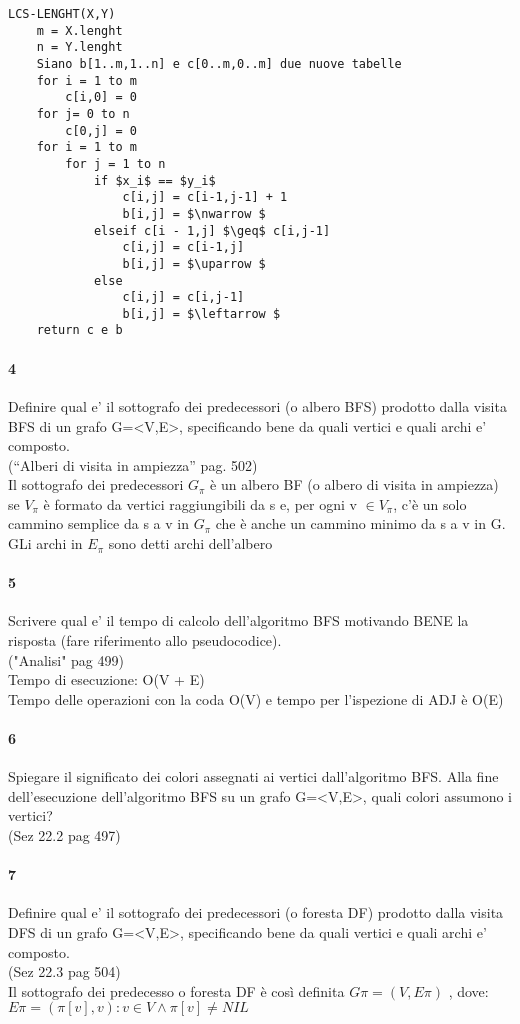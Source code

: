 \documentclass[12pt, a4paper, openany]{book}
\begin{document}
	\begin{lstlisting}[mathescape=true]
LCS-LENGHT(X,Y)
    m = X.lenght
    n = Y.lenght
    Siano b[1..m,1..n] e c[0..m,0..m] due nuove tabelle
    for i = 1 to m
        c[i,0] = 0
    for j= 0 to n
        c[0,j] = 0
    for i = 1 to m
        for j = 1 to n
            if $x_i$ == $y_i$
                c[i,j] = c[i-1,j-1] + 1  
                b[i,j] = $\nwarrow $
            elseif c[i - 1,j] $\geq$ c[i,j-1]
                c[i,j] = c[i-1,j]  
                b[i,j] = $\uparrow $
            else
                c[i,j] = c[i,j-1]  
                b[i,j] = $\leftarrow $
    return c e b
\end{lstlisting}
	\paragraph{4}
	Definire qual e’ il sottografo dei predecessori (o albero BFS) prodotto dalla
	visita BFS di un grafo G=<V,E>, specificando bene da quali vertici e quali
	archi e’ composto.\\
	(“Alberi di visita in ampiezza”  pag. 502)\\
	Il sottografo dei predecessori $G_\pi$ è un albero BF (o albero di visita in ampiezza) se $V_\pi$ è formato da vertici raggiungibili da s e, per ogni v $\in V_\pi$, c'è un solo cammino semplice da s a v in $G_\pi$ che è anche un cammino minimo da s a v in G. GLi archi in $E_\pi$ sono detti archi dell'albero
	\paragraph{5}
	Scrivere qual e’ il tempo di calcolo dell’algoritmo BFS motivando BENE la
	risposta (fare riferimento allo pseudocodice).\\
	("Analisi" pag 499)\\
	Tempo di esecuzione: O(V + E)\\
	Tempo delle operazioni con la coda O(V) e tempo per l'ispezione di ADJ è O(E)
	\paragraph{6}
	Spiegare il significato dei colori assegnati ai vertici dall’algoritmo BFS. Alla
	fine dell’esecuzione dell’algoritmo BFS su un grafo G=<V,E>, quali colori
	assumono i vertici?\\
	(Sez 22.2 pag 497)

	\paragraph{7}
	Definire qual e’ il sottografo dei predecessori (o foresta DF) prodotto dalla
	visita DFS di un grafo G=<V,E>, specificando bene da quali vertici e quali
	archi e’ composto.\\
	(Sez 22.3 pag 504)\\
	Il sottografo dei predecesso o foresta DF è così definita $G\pi = (V, E\pi )$ , dove:
$E\pi = {(\pi[v], v) : v \in V \land \pi[v] \neq NIL}$
\end{document}
